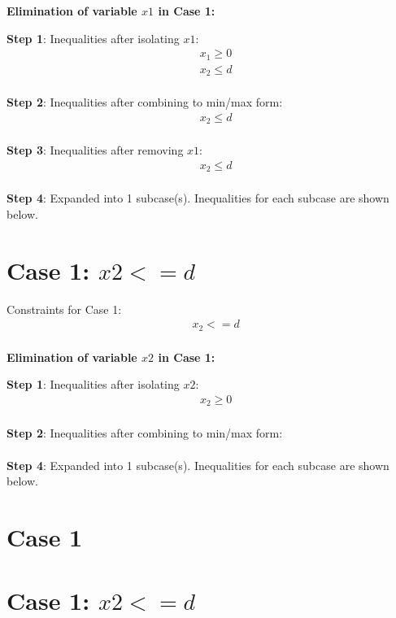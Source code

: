 \documentclass{article}
\begin{document}
\textbf{Elimination of variable $x1$ in Case 1:}

\textbf{Step 1}: Inequalities after isolating $x1$:
\begin{align}
& x_{1} \geq 0 \\
& x_{2} \leq d \\
\end{align}

\textbf{Step 2}: Inequalities after combining to min/max form:
\begin{align}
& x_{2} \leq d \\
\end{align}

\textbf{Step 3}: Inequalities after removing $x1$:
\begin{align}
& x_{2} \leq d \\
\end{align}

\textbf{Step 4}: Expanded into 1 subcase(s). Inequalities for each subcase are shown below.

\section{Case 1: $x2 <= d$}

Constraints for Case 1:
\begin{align}
& x_{2} <= d \\
\end{align}

\textbf{Elimination of variable $x2$ in Case 1:}

\textbf{Step 1}: Inequalities after isolating $x2$:
\begin{align}
& x_{2} \geq 0 \\
\end{align}

\textbf{Step 2}: Inequalities after combining to min/max form:
\begin{align}
\end{align}

\textbf{Step 4}: Expanded into 1 subcase(s). Inequalities for each subcase are shown below.

\section{Case 1}

\section{Case 1: $x2 <= d$}
\end{document}

